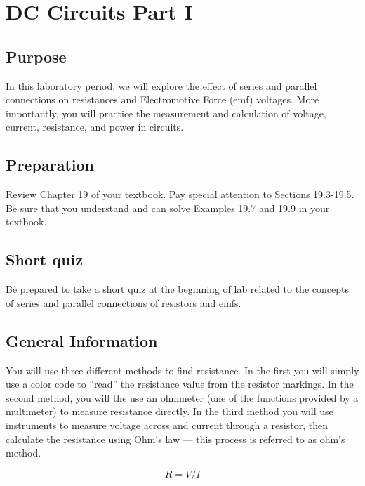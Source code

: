 
\chapter {DC Circuits Part I}

\section{Purpose}  
In this laboratory period, we will explore the effect of series and parallel connections on resistances and Electromotive Force (emf) voltages.  More importantly, you will practice the measurement and calculation of voltage, current, resistance, and power in circuits.

\section{Preparation}  
Review Chapter 19 of your textbook.  Pay special attention to Sections 19.3-19.5.  Be sure that you understand and can solve Examples 19.7 and 19.9 in your textbook.

\section {Short quiz}  Be prepared to take a short quiz at the beginning of lab related to the concepts of series and parallel connections of resistors and emfs.

\section{General Information}
You will use three different methods to find resistance.  In the first you will simply use a color code to ``read'' the resistance value from the resistor markings. In the second method, you will the use an ohmmeter (one of the functions provided by a multimeter) to measure resistance directly.  In the third method you will use instruments to measure voltage across and current through a resistor, then calculate the resistance using Ohm's law --- this process is  referred to as ohm's method.

\begin{equation} R = V/I \label{e:ohm} \end{equation}


